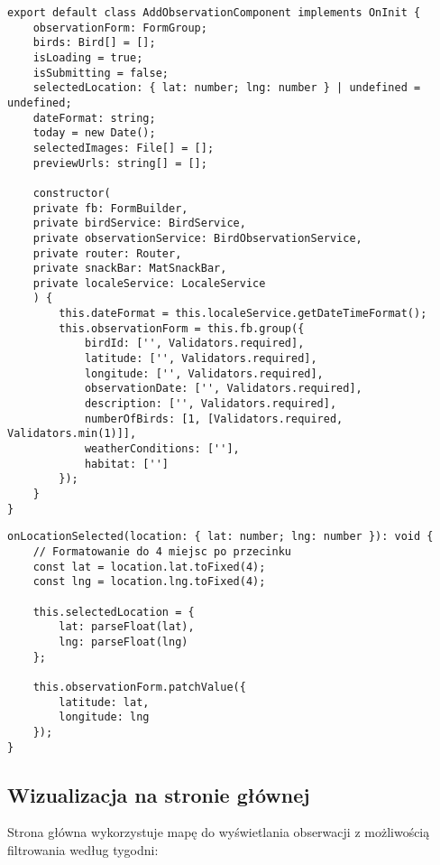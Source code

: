 \begin{lstlisting}[style=tsstyle, caption={Implementacja mapy w formularzu}]
export default class AddObservationComponent implements OnInit {
	observationForm: FormGroup;
	birds: Bird[] = [];
	isLoading = true;
	isSubmitting = false;
	selectedLocation: { lat: number; lng: number } | undefined = undefined;
	dateFormat: string;
	today = new Date();
	selectedImages: File[] = [];
	previewUrls: string[] = [];
	
	constructor(
	private fb: FormBuilder,
	private birdService: BirdService,
	private observationService: BirdObservationService,
	private router: Router,
	private snackBar: MatSnackBar,
	private localeService: LocaleService
	) {
		this.dateFormat = this.localeService.getDateTimeFormat();
		this.observationForm = this.fb.group({
			birdId: ['', Validators.required],
			latitude: ['', Validators.required],
			longitude: ['', Validators.required],
			observationDate: ['', Validators.required],
			description: ['', Validators.required],
			numberOfBirds: [1, [Validators.required, Validators.min(1)]],
			weatherConditions: [''],
			habitat: ['']
		});
	}
}
\end{lstlisting}

\begin{lstlisting}[style=tsstyle, caption={Obsługa wyboru lokalizacji z mapy}]
onLocationSelected(location: { lat: number; lng: number }): void {
	// Formatowanie do 4 miejsc po przecinku
	const lat = location.lat.toFixed(4);
	const lng = location.lng.toFixed(4);
	
	this.selectedLocation = {
		lat: parseFloat(lat),
		lng: parseFloat(lng)
	};
	
	this.observationForm.patchValue({
		latitude: lat,
		longitude: lng
	});
}
\end{lstlisting}

\subsection{Wizualizacja na stronie głównej}

Strona główna wykorzystuje mapę do wyświetlania obserwacji z możliwością filtrowania według tygodni:


